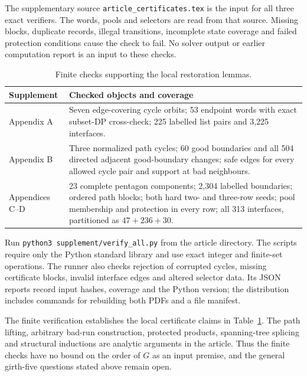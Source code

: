 \documentclass[11pt]{article}
\theoremstyle{remark}
\numberwithin{equation}{section}
\numberwithin{table}{section}
\begin{document}
The supplementary source \texttt{article\_certificates.tex} is the input
for all three exact verifiers. The words, pools and selectors are read
from that source. Missing blocks, duplicate records, illegal transitions,
incomplete state coverage and failed protection conditions cause the
check to fail. No solver output or earlier computation report is an
input to these checks.

\begin{table}[htbp]
\centering\small
\caption{Finite checks supporting the local restoration lemmas.}
\label{tab:verification}
\begin{tabularx}{\linewidth}{@{}lX@{}}
\toprule
Supplement & Checked objects and coverage\\
\midrule
Appendix A & Seven edge-covering cycle orbits; 53 endpoint words with
exact subset-DP cross-check; 225 labelled list pairs and 3,225 interfaces.\\
Appendix B & Three normalized path cycles; 60 good boundaries and all
504 directed adjacent good-boundary changes; safe edges for every
allowed cycle pair and support at bad neighbours.\\
Appendices C--D & 23 complete pentagon components; 2,304 labelled
boundaries; ordered path blocks; both hard two- and three-row seeds;
pool membership and protection in every row; all 313 interfaces,
partitioned as $47+236+30$.\\
\bottomrule
\end{tabularx}
\end{table}

Run \texttt{python3 supplement/verify\_all.py} from the article directory.
The scripts require only the Python standard library and use exact
integer and finite-set operations. The runner also checks rejection
of corrupted cycles, missing certificate blocks, invalid interface
edges and altered selector data. Its JSON reports record input hashes,
coverage and the Python version; the distribution includes commands
for rebuilding both PDFs and a file manifest.

The finite verification establishes the local certificate claims in
Table~\ref{tab:verification}. The path lifting, arbitrary bad-run
construction, protected products, spanning-tree splicing and structural
inductions are analytic arguments in the article. Thus the finite checks
have no bound on the order of $G$ as an input premise, and the general
girth-five questions stated above remain open.
\end{document}
